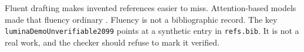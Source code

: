 Fluent drafting makes invented references easier to miss.
Attention-based models made that fluency ordinary \cite{vaswani2017attention}.
Fluency is not a bibliographic record.
The key \texttt{luminaDemoUnverifiable2099} points at a synthetic entry in \texttt{refs.bib}.
It is not a real work, and the checker should refuse to mark it verified.
